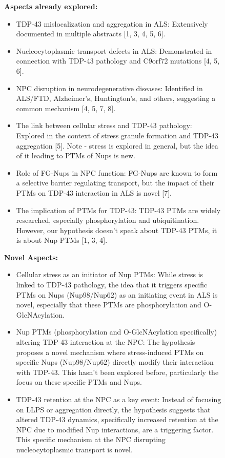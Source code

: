 \begin{figure}[htbp!]
\begin{tcolorbox}[
    colback=black!5!white,
    colframe=black!60!white,
    title=\textbf{Example output of a complete novelty review by the Reflection agent},
    fonttitle=\bfseries,
    arc=3mm,
    boxrule=1pt,
    bottomrule=2pt,
]
\footnotesize
\textbf{Aspects already explored:}
\begin{itemize}
    \item TDP-43 mislocalization and aggregation in ALS: Extensively documented in multiple abstracts [1, 3, 4, 5, 6].
    \item Nucleocytoplasmic transport defects in ALS: Demonstrated in connection with TDP-43 pathology and C9orf72 mutations [4, 5, 6].
    \item NPC disruption in neurodegenerative diseases: Identified in ALS/FTD, Alzheimer's, Huntington's, and others, suggesting a common mechanism [4, 5, 7, 8].
    \item The link between cellular stress and TDP-43 pathology: Explored in the context of stress granule formation and TDP-43 aggregation [5]. Note - stress is explored in general, but the idea of it leading to PTMs of Nups is new.
    \item Role of FG-Nups in NPC function: FG-Nups are known to form a selective barrier regulating transport, but the impact of their PTMs on TDP-43 interaction in ALS is novel [7].
    \item The implication of PTMs for TDP-43: TDP-43 PTMs are widely researched, especially phosphorylation and ubiquitination. However, our hypothesis doesn't speak about TDP-43 PTMs, it is about Nup PTMs [1, 3, 4].
\end{itemize}
\textbf{Novel Aspects:}
\begin{itemize}
    \item Cellular stress as an initiator of Nup PTMs: While stress is linked to TDP-43 pathology, the idea that it triggers specific PTMs on Nups (Nup98/Nup62) as an initiating event in ALS is novel, especially that these PTMs are phosphorylation and O-GlcNAcylation.
    \item Nup PTMs (phosphorylation and O-GlcNAcylation specifically) altering TDP-43 interaction at the NPC: The hypothesis proposes a novel mechanism where stress-induced PTMs on specific Nups (Nup98/Nup62) directly modify their interaction with TDP-43. This hasn't been explored before, particularly the focus on these specific PTMs and Nups.
    \item TDP-43 retention at the NPC as a key event: Instead of focusing on LLPS or aggregation directly, the hypothesis suggests that altered TDP-43 dynamics, specifically increased retention at the NPC due to modified Nup interactions, are a triggering factor. This specific mechanism at the NPC disrupting nucleocytoplasmic transport is novel.

\end{itemize}
\end{tcolorbox}
\end{figure}
